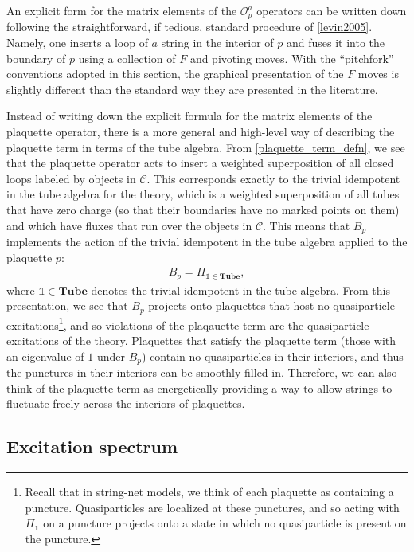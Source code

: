 \documentclass[12pt,a4paper]{article}
\newcommand{\unit}{\mathds{1}}
\newcommand{\mcc}{\mathcal{C}}
\newcommand{\mco}{\mathcal{O}}
\newcommand{\tube}{\textbf{Tube}}
\begin{document}
An explicit form for the matrix elements of the $\mco_p^a$ operators can be written down following the straightforward, if tedious, standard procedure of \ref{levin2005}.
Namely, one inserts a loop of $a$ string in the interior of $p$ and fuses it into the boundary of $p$ using a
collection of $F$ and pivoting moves. 
With the ``pitchfork'' conventions adopted in this section, the graphical presentation of the $F$ moves is
slightly different than the standard way they are presented in the literature.


Instead of writing down the explicit formula for the matrix elements of the plaquette operator, there is a 
more general and high-level way of describing the plaquette term in terms of the tube algebra.
From \eqref{plaquette_term_defn}, we see that the plaquette operator acts to insert a 
weighted superposition of all closed loops labeled by objects in $\mcc$.
This corresponds exactly to the trivial idempotent in the tube algebra for the theory, 
which is a weighted superposition of all tubes that have zero charge (so that their boundaries have no marked points on them) and which have fluxes that run over the objects in $\mcc$.
This means that $B_p$ implements the action of the trivial idempotent in the tube algebra applied to the plaquette $p$:
\begin{align}
B_{p} = \Pi_{\unit \in \tube},
\end{align}
where $\unit\in\tube$ denotes the trivial idempotent in the tube algebra. 
From this presentation, we see that $B_p$ projects onto plaquettes that host no quasiparticle excitations\footnote{Recall that in 
string-net models, we think of each plaquette as containing a puncture. Quasiparticles are localized at 
these punctures, and so acting with $\Pi_\unit$ on a puncture projects onto a state in which no 
quasiparticle is present on the puncture.}, 
and so violations of the plaqauette term are the quasiparticle excitations of the theory. 
Plaquettes that satisfy the plaquette term (those with an eigenvalue of $1$ under $B_p$) contain no 
quasiparticles in their interiors, and thus the punctures in their interiors can be smoothly filled in. 
Therefore, we can also think of the plaquette term as energetically providing a way to allow strings to 
fluctuate freely across the interiors of plaquettes. 



\subsection{Excitation spectrum} \label{excitations_of_H}
\end{document}
